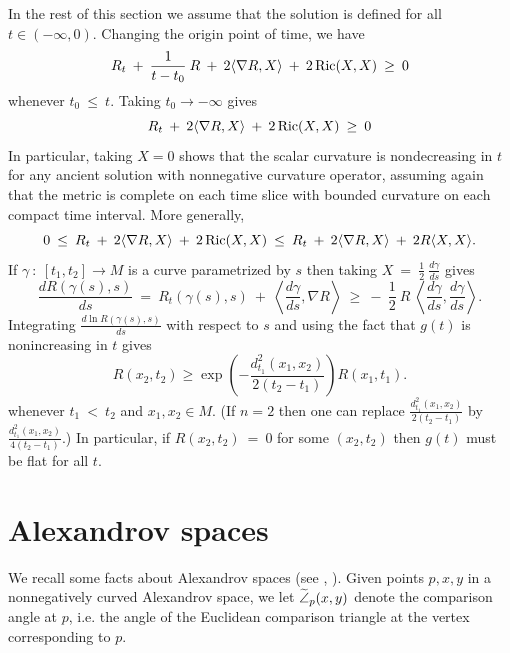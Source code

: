 In the rest of this section we assume that
the solution is defined for all $t \in (- \infty, 0)$.
Changing the origin point of time, we have
\begin{equation}
R_t \: + \: \frac{1}{t- t_0} \: R \: + \:
2 \langle \nabla R, X \rangle \:
+ \: 2 \operatorname{Ric}(X, X) \: \ge \: 0
\end{equation}
whenever $t_0 \: \le \: t$. Taking $t_0 \rightarrow - \infty$ gives
\begin{equation}
R_t \: + \:
2 \langle \nabla R, X \rangle \:
+ \: 2 \operatorname{Ric}(X, X) \: \ge \: 0
\end{equation}
In particular, taking $X = 0$ shows that the scalar curvature is
nondecreasing in $t$ for any ancient solution with nonnegative
curvature operator, assuming again that the metric is complete
on each time slice with bounded curvature
on each compact time interval.
More generally,
\begin{equation}
0 \: \le \: R_t \: + \:
2 \langle \nabla R, X \rangle \:
+ \: 2 \operatorname{Ric}(X, X) \: \le \: R_t \: + \:
2 \langle \nabla R, X \rangle \:
+ \: 2 R \langle X, X \rangle.
\end{equation}
If $\gamma \: : \: [t_1, t_2]
\rightarrow M$ is a curve parametrized by $s$ then taking
$X \: = \: \frac12 \: \frac{d\gamma}{ds}$ gives
\begin{equation}
\frac{d R(\gamma(s), s)}{ds}  \: = \:
R_t(\gamma(s), s) \: + \: \left\langle \frac{d\gamma}{ds}, \nabla R
\right\rangle
\: \ge \: - \: \frac12 \: R \: \left\langle \frac{d\gamma}{ds}, \frac{d\gamma}{ds}
\right\rangle.
\end{equation}
Integrating $\frac{d \ln R(\gamma(s),s)}{ds}$ with respect to $s$ and using the fact that
$g(t)$ is nonincreasing in $t$ gives
\begin{equation}
\label{harnackinequality}
R(x_2,t_2)\geq
\exp\left(-\frac{d_{t_1}^2(x_1,x_2)}{2(t_2-t_1)}\right)R(x_1,t_1).
\end{equation}
whenever $t_1 \: < \: t_2$ and $x_1, x_2 \in M$.
(If $n = 2$ then one can replace $\frac{d_{t_1}^2(x_1,x_2)}{2(t_2-t_1)}$ by
$\frac{d_{t_1}^2(x_1,x_2)}{4(t_2-t_1)}$.) In particular, if
$R(x_2, t_2) \: = \: 0$ for some $(x_2, t_2)$ then $g(t)$ must be flat
for all $t$.



\section{Alexandrov spaces} \label{Alexandrov}

We recall some facts about Alexandrov spaces
(see \cite[Chapter 10]{Burago-Burago-Ivanov},
\cite{Burago-Gromov-Perelman}).
Given
points $p,x,y$ in a nonnegatively curved Alexandrov space,
we let $\widetilde{\angle}_p(x,y)$ denote the comparison angle at $p$,
i.e. the angle of the Euclidean
comparison triangle at the vertex corresponding to $p$.

